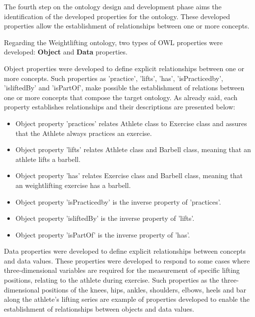 The fourth step on the ontology design and development phase aims the identification of the developed properties for the ontology. These developed properties allow the establishment of relationships between one or more concepts.

Regarding the Weightlifting ontology, two types of OWL properties were developed: \textbf{Object} and \textbf{Data} properties. 

Object properties were developed to define explicit relationships between one or more concepts. Such properties as 'practice', 'lifts', 'has', 'isPracticedby', 'isliftedBy' and 'isPartOf', make possible the establishment of relations between one or more concepts that compose the target ontology. As already said, each property establishes relationships and their descriptions are presented below: 

\begin{itemize}  
	\item Object property 'practices' relates Athlete class to Exercise class and assures that the Athlete always practices an exercise.
	\item Object property 'lifts' relates Athlete class and Barbell class, meaning that an athlete lifts a barbell.
	\item Object property 'has' relates Exercise class and Barbell class, meaning that an weightlifting exercise has a barbell.
	\item Object property 'isPracticedby' is the inverse property of 'practices'.
	\item Object property 'isliftedBy' is the inverse property of 'lifts'.
	\item Object property 'isPartOf' is the inverse property of 'has'.
\end{itemize}

Data properties were developed to define explicit relationships between concepts and data values.
These properties were developed to respond to some cases where three-dimensional variables are required for the measurement of specific lifting positions, relating to the athlete during exercise.
Such properties as the three-dimensional positions of the knees, hips, ankles, shoulders, elbows, heels and bar along the athlete's lifting series are example of properties developed to enable the establishment of relationships between objects and data values.